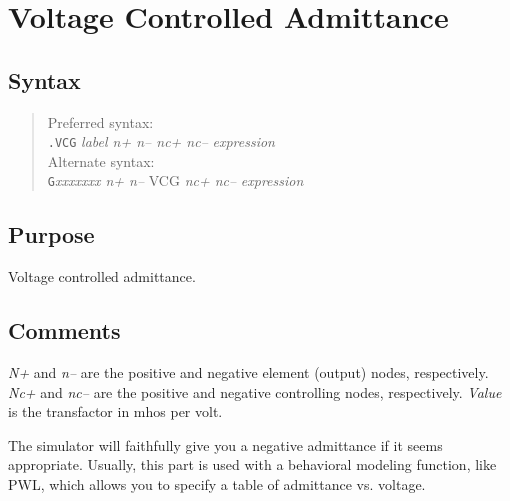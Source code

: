 %
%
%
%
\section{Voltage Controlled Admittance}
\subsection{Syntax}
\begin{verse}
Preferred syntax:\\
{\tt .VCG} {\it label n+ n-- nc+ nc--} {\it expression}\\
Alternate syntax:\\
{\tt G}{\it xxxxxxx n+ n--} VCG {\it nc+ nc--} {\it expression}
\end{verse}
\subsection{Purpose}

Voltage controlled admittance.
\subsection{Comments}

{\it N+} and {\it n--} are the positive and negative element (output) nodes,
respectively.  {\it Nc+} and {\it nc--} are the positive and negative
controlling nodes, respectively.  {\it Value} is the transfactor in
mhos per volt.

The simulator will faithfully give you a negative admittance if it
seems appropriate.  Usually, this part is used with a behavioral
modeling function, like PWL, which allows you to specify a table of
admittance vs. voltage.
